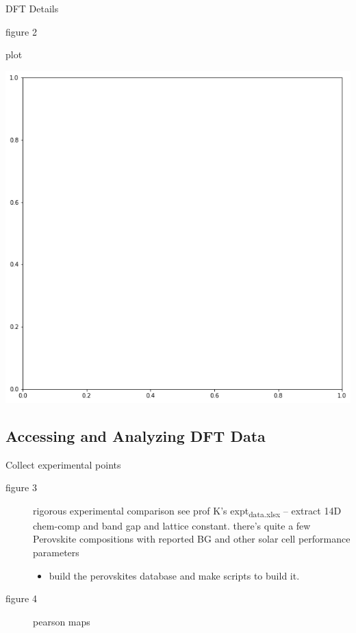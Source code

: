 \documentclass[10pt, compress]{beamer}
\begin{document}
\begin{frame}{DFT Details}
\begin{block}{figure 2}
\begin{block}{plot}
\begin{center}
\includegraphics[width=.9\linewidth]{./.ob-jupyter/2d80835aef2211297f37b26050fad6e2821feb9b.png}
\end{center}
\end{block}
\end{block}
\end{frame}

\subsection{Accessing and Analyzing DFT Data}
\label{sec:orgeda3a30}
\begin{frame}[label={sec:orgd94e261}]{Collect experimental points}
\begin{description}
\item[{figure 3}] rigorous experimental comparison
see prof K's expt\textsubscript{data.xlsx} -- extract 14D chem-comp and band gap and lattice constant.
there's quite a few Perovskite compositions with reported BG and other solar cell performance parameters

\begin{itemize}
\item build the perovskites database and make scripts to build it.
\end{itemize}
\end{description}
\end{frame}
\begin{frame}[label={sec:orgb29d565}]{}
\begin{description}
\item[{figure 4}] pearson maps
\end{description}
\end{frame}
\begin{frame}[label={sec:org66d96df}]{}
\end{frame}
\end{document}
